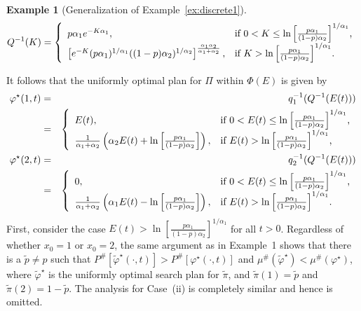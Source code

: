 \documentclass[12pt]{article}
\theoremstyle{plain}
\theoremstyle{definition}
\newtheorem{example}{Example}%
\theoremstyle{remark}
\begin{document}
\begin{example}[Generalization of Example~\ref{ex:discrete1}]
\[		                         
Q^{-1}(K)=\left\{
		                           \begin{array}{ll}
p\alpha_1 e^{-K \alpha_1}, & \hbox{if $0<K \leq\ln \left[\frac{p\alpha_1}{(1-p)\alpha_2}\right]^{1/\alpha_1}$,} \\
  \left[e^{-K} (p\alpha_1)^{1/\alpha_1}((1-p)\alpha_2)^{1/\alpha_2}\right]^{\frac{\alpha_1\alpha_2}{\alpha_1+\alpha_2}},  & \hbox{if $K>\ln \left[\frac{p\alpha_1}{(1-p)\alpha_2}\right]^{1/\alpha_1}$.}
		                          \end{array}
		                         \right.	                         
\]


It follows that the uniformly optimal plan for $\Pi$ within $\Phi(E)$ is given by 
\begin{eqnarray*}
\varphi^\star(1, t)&=&q_1^{-1}(Q^{-1}(E(t))) \\
&=&  \left\{
		                           \begin{array}{ll}
		                           E(t),& \hbox{if $0<E(t)\leq \ln \left[\frac{p\alpha_1}{(1-p)\alpha_2}\right]^{1/\alpha_1}$,} \\
					\frac{1}{\alpha_1+\alpha_2}\left(\alpha_2E(t)+\ln \left[\frac{p\alpha_1}{(1-p)\alpha_2}\right]\right) , & \hbox{if $E(t)>\ln \left[\frac{p\alpha_1}{(1-p)\alpha_2}\right]^{1/\alpha_1}$,}
		                          \end{array}
		                         \right. \\
\varphi^\star(2, t)&=&q_2^{-1}(Q^{-1}(E(t))) \\
&=&  \left\{
		                           \begin{array}{ll}
		                           0,& \hbox{if $0<E(t)\leq \ln \left[\frac{p\alpha_1}{(1-p)\alpha_2}\right]^{1/\alpha_1}$,} \\
					\frac{1}{\alpha_1+\alpha_2}\left(\alpha_1E(t)-\ln \left[\frac{p\alpha_1}{(1-p)\alpha_2}\right]\right) , & \hbox{if $E(t)>\ln \left[\frac{p\alpha_1}{(1-p)\alpha_2}\right]^{1/\alpha_1}$.}
		                          \end{array}
		                         \right. \\		                         
\end{eqnarray*}
First, consider the case $E(t)> \ln \left[\frac{p\alpha_1}{(1-p)\alpha_2}\right]^{1/\alpha_1}$ for all $t>0$. Regardless of whether $x_0=1$ or $x_0=2$,  the same argument as in Example~1 shows that there is a $\widetilde{p}\neq p$ such that $P^{\#}[\widetilde{\varphi}^\star(\cdot, t)]>P^{\#}[\varphi^\star(\cdot, t)]$ and $\mu^{\#}(\widetilde{\varphi}^\star)<\mu^{\#}(\varphi^\star)$, where $\widetilde{\varphi}^\star$ is the uniformly optimal search plan for $\widetilde{\pi}$, and $\widetilde{\pi}(1)=\widetilde{p}$ and $\widetilde{\pi}(2)=1-\widetilde{p}$.   The analysis for Case~(ii) is completely similar and hence is omitted.  


\end{example}
\end{document}
